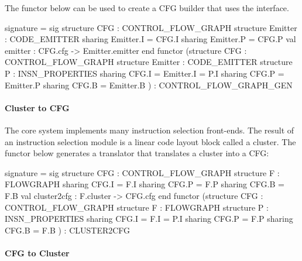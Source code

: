 The functor  below can be
used to create a CFG builder that uses the  interface.
\begin{SML}
 signature  = sig
   structure CFG     : CONTROL_FLOW_GRAPH
   structure Emitter : CODE_EMITTER
       sharing Emitter.I = CFG.I
       sharing Emitter.P = CFG.P
   val emitter : CFG.cfg -> Emitter.emitter
 end
 functor 
    (structure CFG     : CONTROL_FLOW_GRAPH
     structure Emitter : CODE_EMITTER
     structure P       : INSN_PROPERTIES
         sharing CFG.I = Emitter.I = P.I
         sharing CFG.P = Emitter.P
         sharing CFG.B = Emitter.B
    ) : CONTROL_FLOW_GRAPH_GEN
\end{SML}

\paragraph{Cluster to CFG}

The core \MLRISC{} system implements many instruction selection
front-ends.  The result of an instruction selection module is a linear 
code layout block called a cluster.  The functor  below 
generates a translator that translates a cluster into a CFG:
\begin{SML}
 signature  = sig
   structure CFG : CONTROL_FLOW_GRAPH
   structure F   : FLOWGRAPH
      sharing CFG.I = F.I
      sharing CFG.P = F.P
      sharing CFG.B = F.B
   val cluster2cfg : F.cluster -> CFG.cfg
 end 
 functor 
   (structure CFG : CONTROL_FLOW_GRAPH 
    structure F   : FLOWGRAPH
    structure P   : INSN_PROPERTIES
       sharing CFG.I = F.I = P.I 
       sharing CFG.P = F.P
       sharing CFG.B = F.B
   ) : CLUSTER2CFG 
\end{SML}

\paragraph{CFG to Cluster}

